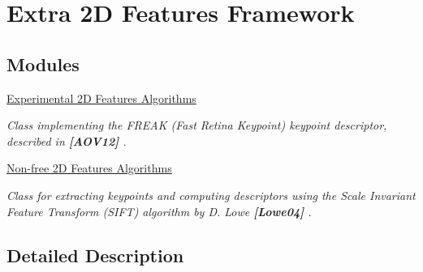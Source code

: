 \hypertarget{group__xfeatures2d}{}\section{Extra 2D Features Framework}
\label{group__xfeatures2d}
\subsection*{Modules}
\begin{DoxyCompactItemize}
\item 
\hyperlink{group__xfeatures2d__experiment}{Experimental 2\+D Features Algorithms}
\begin{DoxyCompactList}\small\item\em Class implementing the F\+R\+E\+AK ({\itshape Fast Retina Keypoint}) keypoint descriptor, described in {\bfseries [A\+O\+V12]} . \end{DoxyCompactList}\item 
\hyperlink{group__xfeatures2d__nonfree}{Non-\/free 2\+D Features Algorithms}
\begin{DoxyCompactList}\small\item\em Class for extracting keypoints and computing descriptors using the Scale Invariant Feature Transform (S\+I\+FT) algorithm by D. Lowe {\bfseries [Lowe04]} . \end{DoxyCompactList}\end{DoxyCompactItemize}


\subsection{Detailed Description}
